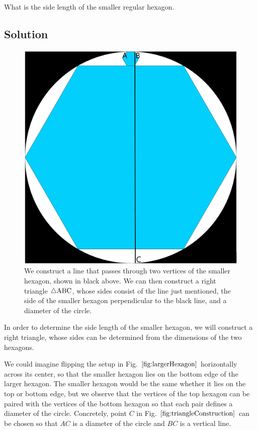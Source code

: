 \documentclass[reqno]{amsart}
\begin{document}
What is the side length of the smaller regular hexagon. 

\subsection*{Solution}

\begin{figure}[h]
	\centering
	\includegraphics[scale = 0.25]{LinedHexagon.png}
	\caption{We construct a line that passes through two vertices of the smaller hexagon, shown in black above. We can then construct a right triangle $\triangle{\rm ABC}$, whose sides consist of the line just mentioned, the side of the smaller hexagon perpendicular to the black line, and a diameter of the circle.}
	\label{fig:triangleConstruction}
\end{figure}

In order to determine the side length of the smaller hexagon, we will construct a right triangle, whose sides can be determined from the dimensions of the two hexagons. 

We could imagine flipping the setup in Fig. $\ref{fig:largerHexagon}$ horizontally across its center, so that the smaller hexagon lies on the bottom edge of the larger hexagon. The smaller hexagon would be the same whether it lies on the top or bottom edge, but we observe that the vertices of the top hexagon can be paired with the vertices of the bottom hexagon so that each pair defines a diameter of the circle. Concretely, point $C$ in Fig. $\ref{fig:triangleConstruction}$ can be chosen so that $AC$ is a diameter of the circle and $BC$ is a vertical line. 
\end{document}
